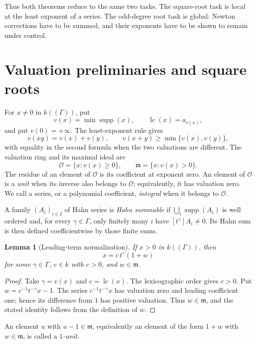 \documentclass[11pt]{article}
\newcommand{\Val}{v}
\newcommand{\Supp}{\operatorname{supp}}
\newcommand{\lc}{\operatorname{lc}}
\newcommand{\Ocal}{\mathcal O}
\theoremstyle{proofnote}
\newtheorem{lemma}[theorem]{Lemma}
\begin{document}
Thus both theorems reduce to the same two tasks.  The square-root task is
local at the least exponent of a series.  The odd-degree root task is
global: Newton corrections have to be summed, and their exponents have to
be shown to remain under control.

\section{Valuation preliminaries and square roots}
\label{sec:square-roots}

For \(x\ne0\) in \(k((\Gamma))\), put
\[
  \Val(x)=\min\Supp(x),\qquad
  \lc(x)=a_{\Val(x)},
\]
and put \(\Val(0)=+\infty\).  The least-exponent rule gives
\[
  \Val(xy)=\Val(x)+\Val(y),\qquad
  \Val(x+y)\ge
  \min\{\Val(x),\Val(y)\},
\]
with equality in the second formula when the two valuations are different.
The valuation ring and its maximal ideal are
\[
  \Ocal=\{x:\Val(x)\ge0\},
  \qquad
  \mathfrak m=\{x:\Val(x)>0\}.
\]
The residue of an element of \(\Ocal\) is its coefficient at exponent zero.
An element of \(\Ocal\) is a \emph{unit} when its inverse also belongs to
\(\Ocal\); equivalently, it has valuation zero.  We call a series, or a
polynomial coefficient, \emph{integral} when it belongs to \(\Ocal\).

A family \((A_i)_{i\in I}\) of Hahn series is \emph{Hahn summable} if
\(\bigcup_i\Supp(A_i)\) is well ordered and, for every \(\gamma\in\Gamma\),
only finitely many \(i\) have \([t^\gamma]A_i\ne0\).  Its Hahn sum is then
defined coefficientwise by those finite sums.

\begin{lemma}[Leading-term normalization]
\label{lem:leading-term}
  If \(x>0\) in \(k((\Gamma))\), then
  \[
    x=c\,t^\gamma(1+w)
  \]
  for some \(\gamma\in\Gamma\), \(c\in k\) with \(c>0\), and
  \(w\in\mathfrak m\).
\end{lemma}
\begin{proof}
  Take \(\gamma=\Val(x)\) and \(c=\lc(x)\).  The lexicographic order gives
  \(c>0\).  Put \(w=c^{-1}t^{-\gamma}x-1\).  The series
  \(c^{-1}t^{-\gamma}x\) has valuation zero and leading coefficient one;
  hence its difference from \(1\) has positive valuation.  Thus
  \(w\in\mathfrak m\), and the stated identity follows from the definition
  of \(w\).
\end{proof}

An element \(u\) with \(u-1\in\mathfrak m\), equivalently an element of the
form \(1+w\) with \(w\in\mathfrak m\), is called a \emph{\(1\)-unit}.
\end{document}
